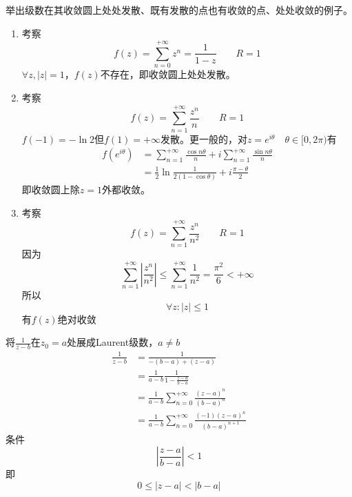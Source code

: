 \begin{homeworkProblem}
举出级数在其收敛圆上处处发散、既有发散的点也有收敛的点、处处收敛的例子。
\solution
\begin{enumerate}
    \item 考察
    \[f(z) = \sum_{n=0}^{+\infty}z^n = \frac{1}{1-z}\qquad R=1\]
    $\forall z, |z|=1$，$f(z)$不存在，即收敛圆上处处发散。
    \item 考察
    \[f(z) = \sum_{n=1}^{+\infty}\frac{z^n}{n} \qquad R=1\]
    $f(-1)=-\ln2$但$f(1)=+\infty$发散。更一般的，对$z=e^{i\theta}\quad\theta\in[0,2\pi)$有
    \[\begin{split}
    f(e^{i\theta}) &= \sum_{n=1}^{+\infty}\frac{\cos n\theta}{n}+i\sum_{n=1}^{+\infty}\frac{\sin n\theta}{n} \\
    &= \frac{1}{2}\ln\frac{1}{2(1-\cos\theta)}+i\frac{\pi-\theta}{2}
    \end{split}
    \]
    即收敛圆上除$z=1$外都收敛。
    \item 考察
    \[
    f(z) = \sum_{n=1}^{+\infty}\frac{z^n}{n^2}\qquad R=1
    \]
    因为
    \[
    \sum_{n=1}^{+\infty}\left|\frac{z^n}{n^2}\right| \leq \sum_{n=1}^{+\infty} \frac{1}{n^2} = \frac{\pi^2}{6} < +\infty
    \]
    所以
    \[\forall z:|z|\leq1\]有$f(z)$绝对收敛
\end{enumerate}
\end{homeworkProblem}
\begin{homeworkProblem}
    将$\frac{1}{z-b}$在$z_0=a$处展成Laurent级数，$a\neq b$\\
\solution
\[\begin{split}
\frac{1}{z-b}
&= \frac{1}{-(b-a) + (z-a)}\\
&= \frac{1}{a-b}\frac{1}{1-\frac{z-a}{b-a}} \\
&= \frac{1}{a-b}\sum_{n=0}^{+\infty}\frac{(z-a)^n}{(b-a)^n}\\
&= \frac{1}{a-b}\sum_{n=0}^{+\infty}\frac{(-1)(z-a)^n}{(b-a)^{n+1}}
\end{split}\]
条件
\[
|\frac{z-a}{b-a}| < 1
\]
即\[0\leq|z-a|<|b-a|\]
\end{homeworkProblem}

